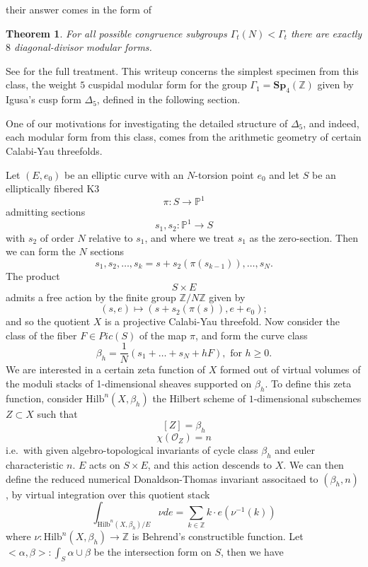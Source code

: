 \documentclass[9pt]{amsart} \usepackage[utf8]{inputenc}
\newtheorem{theorem}{Theorem}
\newcommand{\Z}{\mathbb{Z}} \newcommand{\C}{\mathbb{C}}
\begin{document}
their answer comes in the form of

\begin{theorem}
For all possible congruence subgroups $\Gamma_t(N) < \Gamma_t$ there are exactly $8$
diagonal-divisor modular forms.
\end{theorem}

See \cite{GC} for the full treatment. This writeup concerns the simplest
specimen from this class, the weight $5$ cuspidal modular form for the group
$\Gamma_1 = \mathbf{Sp}_4(\mathbb{Z})$ given by Igusa's cusp form
$\Delta_5$, defined in the following section.

One of our motivations for investigating the detailed structure of
$\Delta_5$, and indeed, each modular form from this class, comes from
the arithmetic geometry of certain Calabi-Yau threefolds.

Let $(E,e_0)$ be an elliptic curve with an $N$-torsion point $e_0$ and
let $S$ be an elliptically fibered K3 $$\pi: S \rightarrow
\mathbb{P}^1$$ admitting sections $$s_1, s_2 : \mathbb{P}^1 \rightarrow
S$$ with $s_2$ of order $N$ relative to $s_1$, and where we treat $s_1$
as the zero-section. Then we can form the $N$ sections $$s_1, s_2,
\ldots, s_k = s + s_2(\pi(s_{k-1})),\ldots, s_N.$$ The product $$S\times
E$$ admits a free action by the finite group $\Z/N\Z$ given by $$(s,e)
\mapsto (s + s_2(\pi(s)),e + e_0);$$ and so the quotient $X$ is a projective
Calabi-Yau threefold. Now consider the
class of the fiber $F \in Pic(S)$ of the map $\pi$, and form the curve
class $$\beta_h = \frac{1}{N}(s_1 + \ldots + s_N + hF), \text{ for }
h\geq 0.$$ We are interested in a certain zeta function of $X$ formed out of
virtual volumes of the moduli stacks of 1-dimensional sheaves supported
on $\beta_h$. To define this zeta function, consider $\mathrm{Hilb}^n(X,
\beta_h)$ the Hilbert scheme of $1$-dimensional subschemes $Z \subset X$
such that $$[Z] = \beta_h$$ $$\chi(\mathcal{O}_Z) = n$$
i.e.\ with given algebro-topological invariants of cycle class $\beta_h$
and euler characteristic $n$. $E$ acts on $S\times E$, and this action
descends to $X$. We can then define the reduced numerical Donaldson-Thomas
invariant associtaed to $(\beta_h,n)$
\cite{DT},\cite{OB} by virtual integration over this quotient stack
$$\int_{\mathrm{Hilb}^n(X,\beta_h)/E} \nu de = \sum_{k\in \mathbb{Z}}
k\cdot e(\nu^{-1}(k))$$ where $\nu: \mathrm{Hilb}^n(X,\beta_h)
\rightarrow \mathbb{Z}$ is Behrend's constructible function. Let
$<\alpha,\beta>: \int_S \alpha \cup \beta$ be the intersection form on
$S$, then we have \cite{OB}
\end{document}
